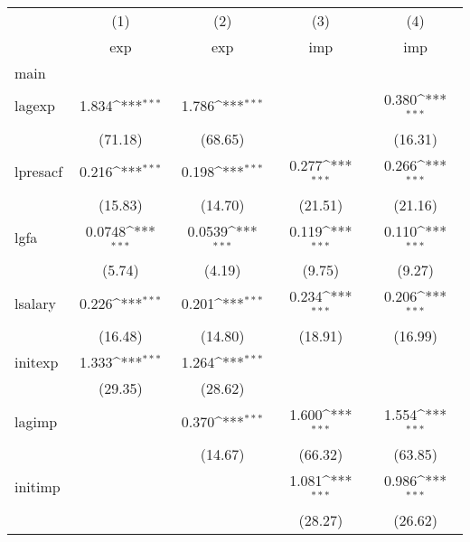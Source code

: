 {
\def\sym#1{\ifmmode^{#1}\else\(^{#1}\)\fi}
\begin{tabular}{l*{4}{c}}
\hline\hline
            &\multicolumn{1}{c}{(1)}&\multicolumn{1}{c}{(2)}&\multicolumn{1}{c}{(3)}&\multicolumn{1}{c}{(4)}\\
            &\multicolumn{1}{c}{exp}&\multicolumn{1}{c}{exp}&\multicolumn{1}{c}{imp}&\multicolumn{1}{c}{imp}\\
\hline
main        &                     &                     &                     &                     \\
lagexp      &       1.834\sym{***}&       1.786\sym{***}&                     &       0.380\sym{***}\\
            &     (71.18)         &     (68.65)         &                     &     (16.31)         \\
[1em]
lpresacf    &       0.216\sym{***}&       0.198\sym{***}&       0.277\sym{***}&       0.266\sym{***}\\
            &     (15.83)         &     (14.70)         &     (21.51)         &     (21.16)         \\
[1em]
lgfa        &      0.0748\sym{***}&      0.0539\sym{***}&       0.119\sym{***}&       0.110\sym{***}\\
            &      (5.74)         &      (4.19)         &      (9.75)         &      (9.27)         \\
[1em]
lsalary     &       0.226\sym{***}&       0.201\sym{***}&       0.234\sym{***}&       0.206\sym{***}\\
            &     (16.48)         &     (14.80)         &     (18.91)         &     (16.99)         \\
[1em]
initexp     &       1.333\sym{***}&       1.264\sym{***}&                     &                     \\
            &     (29.35)         &     (28.62)         &                     &                     \\
[1em]
lagimp      &                     &       0.370\sym{***}&       1.600\sym{***}&       1.554\sym{***}\\
            &                     &     (14.67)         &     (66.32)         &     (63.85)         \\
[1em]
initimp     &                     &                     &       1.081\sym{***}&       0.986\sym{***}\\
            &                     &                     &     (28.27)         &     (26.62)         \\

\end{tabular}}
